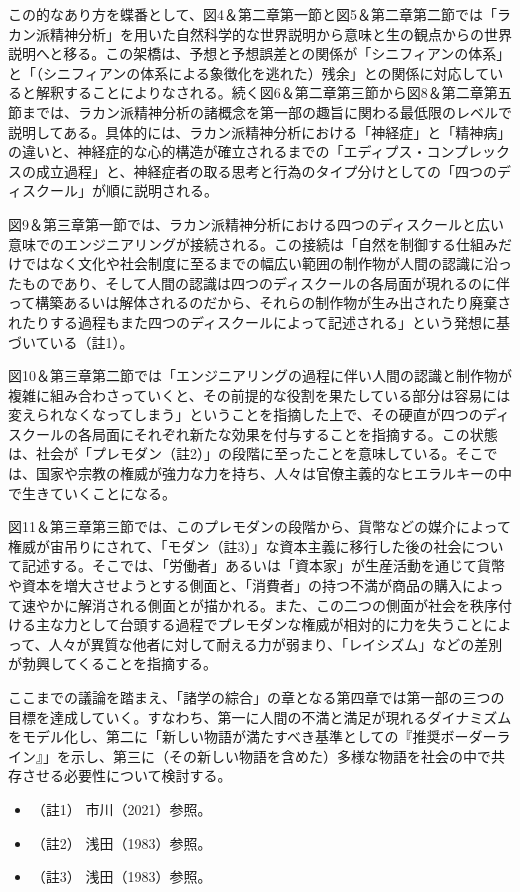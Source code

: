 この的なあり方を蝶番として、図4＆第二章第一節と図5＆第二章第二節では「ラカン派精神分析」を用いた自然科学的な世界説明から意味と生の観点からの世界説明へと移る。この架橋は、予想と予想誤差との関係が「シニフィアンの体系」と「（シニフィアンの体系による象徴化を逃れた）残余」との関係に対応していると解釈することによりなされる。続く図6＆第二章第三節から図8＆第二章第五節までは、ラカン派精神分析の諸概念を第一部の趣旨に関わる最低限のレベルで説明してある。具体的には、ラカン派精神分析における「神経症」と「精神病」の違いと、神経症的な心的構造が確立されるまでの「エディプス・コンプレックスの成立過程」と、神経症者の取る思考と行為のタイプ分けとしての「四つのディスクール」が順に説明される。

図9＆第三章第一節では、ラカン派精神分析における四つのディスクールと広い意味でのエンジニアリングが接続される。この接続は「自然を制御する仕組みだけではなく文化や社会制度に至るまでの幅広い範囲の制作物が人間の認識に沿ったものであり、そして人間の認識は四つのディスクールの各局面が現れるのに伴って構築あるいは解体されるのだから、それらの制作物が生み出されたり廃棄されたりする過程もまた四つのディスクールによって記述される」という発想に基づいている（註1）。

図10＆第三章第二節では「エンジニアリングの過程に伴い人間の認識と制作物が複雑に組み合わさっていくと、その前提的な役割を果たしている部分は容易には変えられなくなってしまう」ということを指摘した上で、その硬直が四つのディスクールの各局面にそれぞれ新たな効果を付与することを指摘する。この状態は、社会が「プレモダン（註2）」の段階に至ったことを意味している。そこでは、国家や宗教の権威が強力な力を持ち、人々は官僚主義的なヒエラルキーの中で生きていくことになる。

図11＆第三章第三節では、このプレモダンの段階から、貨幣などの媒介によって権威が宙吊りにされて、「モダン（註3）」な資本主義に移行した後の社会について記述する。そこでは、「労働者」あるいは「資本家」が生産活動を通じて貨幣や資本を増大させようとする側面と、「消費者」の持つ不満が商品の購入によって速やかに解消される側面とが描かれる。また、この二つの側面が社会を秩序付ける主な力として台頭する過程でプレモダンな権威が相対的に力を失うことによって、人々が異質な他者に対して耐える力が弱まり、「レイシズム」などの差別が勃興してくることを指摘する。

ここまでの議論を踏まえ、「諸学の綜合」の章となる第四章では第一部の三つの目標を達成していく。すなわち、第一に人間の不満と満足が現れるダイナミズムをモデル化し、第二に「新しい物語が満たすべき基準としての『推奨ボーダーライン』」を示し、第三に（その新しい物語を含めた）多様な物語を社会の中で共存させる必要性について検討する。

\begin{itemize}
\tightlist
\item
  （註1） 市川（2021）\cite{Ichikawa}参照。
\item
  （註2） 浅田（1983）\cite{Asada}参照。
\item
  （註3） 浅田（1983）\cite{Asada}参照。
\end{itemize}
